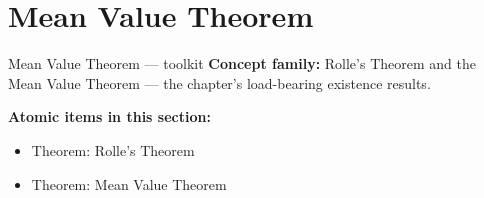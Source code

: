 \section{Mean Value Theorem}

\begin{toolkitbox}{Mean Value Theorem --- toolkit}
\textbf{Concept family:} Rolle's Theorem and the Mean Value Theorem --- the chapter's load-bearing existence results.

\medskip
\textbf{Atomic items in this section:}
\begin{itemize}
  \item Theorem: Rolle's Theorem
  \item Theorem: Mean Value Theorem
\end{itemize}
\end{toolkitbox}


